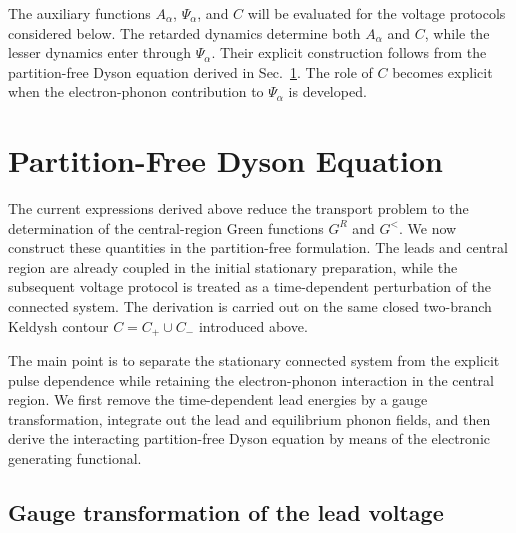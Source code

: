 \documentclass[
 reprint,
 superscriptaddress,
 amsmath,amssymb,
 aps,prb,
 longbibliography,
 floatfix
]{revtex4-2}
\begin{document}
The auxiliary functions \(A_\alpha\), \(\Psi_\alpha\), and \(C\) will be evaluated for the voltage protocols considered below. The retarded dynamics determine both \(A_\alpha\) and \(C\), while the lesser dynamics enter through \(\Psi_\alpha\). Their explicit construction follows from the partition-free Dyson equation derived in Sec.~\ref{sec:partition-free-dyson}. The role of \(C\) becomes explicit when the electron-phonon contribution to \(\Psi_\alpha\) is developed.

\section{Partition-Free Dyson Equation}
\label{sec:partition-free-dyson}

The current expressions derived above reduce the transport problem to the determination of the central-region Green functions \(G^R\) and
\(G^<\). We now construct these quantities in the partition-free formulation. The leads and central region are already coupled in the initial stationary preparation, while the subsequent voltage protocol is treated as a time-dependent perturbation of the connected system. The derivation is carried out on the same closed two-branch Keldysh contour \(C=C_+\cup C_-\) introduced above.

The main point is to separate the stationary connected system from the explicit pulse dependence while retaining the electron-phonon interaction in the central region. We first remove the time-dependent lead energies by a gauge transformation, integrate out the lead and equilibrium phonon fields, and then derive the interacting partition-free Dyson equation by means of the electronic generating functional.

\subsection{Gauge transformation of the lead voltage}
\label{subsec:pf-gauge}
\end{document}
